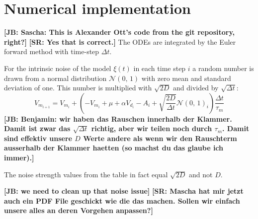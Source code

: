 \documentclass[12pt,a4paper]{article}
\newcommand{\note}[2][]{\textbf{[#1: #2]}}
\begin{document}
\section{Numerical implementation}




\note[JB]{Sascha: This is Alexander Ott's code from the git repository, right?}
\note[SR]{Yes that is correct.}
The ODEs are integrated by the Euler forward method with time-step $\Delta t$.

For the intrinsic noise of the model $\xi(t)$ in each time step $i$ a random number is drawn from a normal distribution $\mathcal{N}(0,\,1)$ with zero mean and standard deviation of one. This number is multiplied with $\sqrt{2D}$ and divided by $\sqrt{\Delta t}$:
\begin{equation}
  \label{LIFintegration}
  V_{m_{i+1}}  = V_{m_i} + \left(-V_{m_i} + \mu + \alpha V_{d_i} - A_i + \sqrt{\frac{2D}{\Delta t}}\mathcal{N}(0,\,1)_i\right) \frac{\Delta t}{\tau_m}
\end{equation}
\note[JB]{Benjamin: wir haben das Rauschen innerhalb der Klammer. Damit ist zwar das $\sqrt{\Delta t}$ richtig, aber wir teilen noch durch $\tau_m$. Damit sind effektiv unsere $D$ Werte andere als wenn wir den Rauschterm ausserhalb der Klammer haetten (so machst du das glaube ich immer).}

The noise strength values from the table in fact equal $\sqrt{2D}$ and not $D$.

\note[JB]{we need to clean up that noise issue}
\note[SR]{Mascha hat mir jetzt auch ein PDF File geschickt wie die das machen. Sollen wir einfach unsere alles an deren Vorgehen anpassen?}
\end{document}
